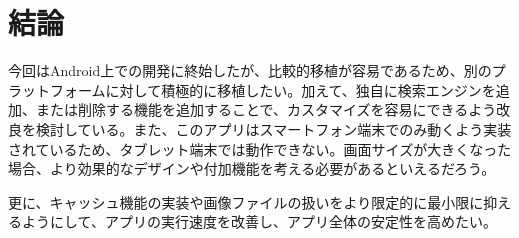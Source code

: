 \chapter{結論}
\label{chap:conclusion}

今回はAndroid上での開発に終始したが、比較的移植が容易であるため、別のプラットフォームに対して積極的に移植したい。加えて、独自に検索エンジンを追加、または削除する機能を追加することで、カスタマイズを容易にできるよう改良を検討している。また、このアプリはスマートフォン端末でのみ動くよう実装されているため、タブレット端末では動作できない。画面サイズが大きくなった場合、より効果的なデザインや付加機能を考える必要があるといえるだろう。

更に、キャッシュ機能の実装や画像ファイルの扱いをより限定的に最小限に抑えるようにして、アプリの実行速度を改善し、アプリ全体の安定性を高めたい。